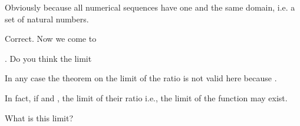 \begin{s}
Obviously because all numerical sequences have one and the same domain, i.e. a set of natural numbers. 
\end{s}


\begin{p}
Correct. Now we come to 

\textbf{}. Do you think the limit
\end{p}
  
\begin{s}
In any case the theorem on the limit of the ratio is not valid here because .
\end{s}

\begin{p}
In fact, if  and , the limit of their ratio i.e., the limit of the function  may exist. 
\end{p}

\begin{s}
What is this limit? 
\end{s}

